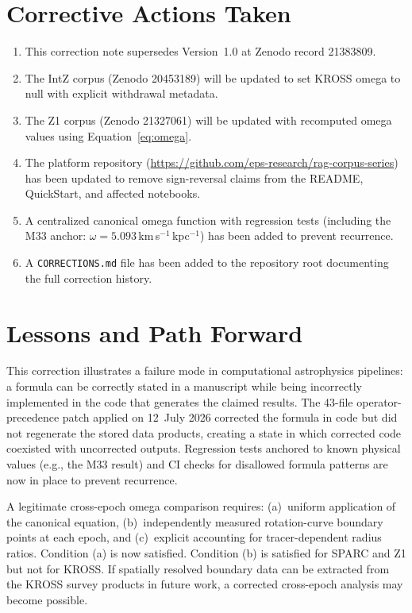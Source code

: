 \documentclass[a4paper,12pt]{article}
\newcommand{\om}{\omega}
\newcommand{\omunit}{km\,s$^{-1}$\,kpc$^{-1}$}
\begin{document}
\section{Corrective Actions Taken}
\label{sec:actions}

\begin{enumerate}
  \item This correction note supersedes Version~1.0 at Zenodo
        record 21383809.
  \item The IntZ corpus (Zenodo 20453189) will be updated to set
        KROSS omega to null with explicit withdrawal metadata.
  \item The Z1 corpus (Zenodo 21327061) will be updated with
        recomputed omega values using Equation~\ref{eq:omega}.
  \item The platform repository
        (\url{https://github.com/eps-research/rag-corpus-series})
        has been updated to remove sign-reversal claims from the
        README, QuickStart, and affected notebooks.
  \item A centralized canonical omega function with regression
        tests (including the M33 anchor: $\om = 5.093$\,\omunit)
        has been added to prevent recurrence.
  \item A \texttt{CORRECTIONS.md} file has been added to the
        repository root documenting the full correction history.
\end{enumerate}

\section{Lessons and Path Forward}
\label{sec:forward}

This correction illustrates a failure mode in computational
astrophysics pipelines: a formula can be correctly stated in a
manuscript while being incorrectly implemented in the code that
generates the claimed results. The 43-file operator-precedence
patch applied on 12~July 2026 corrected the formula in code but did
not regenerate the stored data products, creating a state in which
corrected code coexisted with uncorrected outputs. Regression tests
anchored to known physical values (e.g., the M33 result) and
CI checks for disallowed formula patterns are now in place to
prevent recurrence.

A legitimate cross-epoch omega comparison requires: (a)~uniform
application of the canonical equation, (b)~independently measured
rotation-curve boundary points at each epoch, and (c)~explicit
accounting for tracer-dependent radius ratios. Condition (a) is now
satisfied. Condition (b) is satisfied for SPARC and Z1 but not for
KROSS. If spatially resolved boundary data can be extracted from
the KROSS survey products in future work, a corrected cross-epoch
analysis may become possible.
\end{document}
